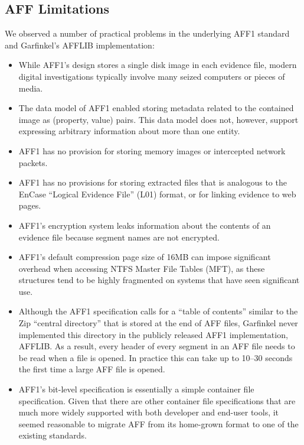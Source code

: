 \documentclass[10pt, conference]{IEEEtran}
\begin{document}
\subsection{AFF Limitations}
We observed a number of practical problems in the underlying AFF1
standard and Garfinkel's AFFLIB implementation:

\begin{itemize}
\item While AFF1's design stores a single disk image in each evidence
  file, modern digital investigations typically involve many seized
  computers or pieces of media. 

\item The data model of AFF1 enabled storing metadata related to the 
  contained image as (property, value) pairs. This data model does
  not, however, support expressing arbitrary information about more
  than one entity.

\item AFF1 has no provision for storing memory images or intercepted
  network packets.

\item AFF1 has no provisions for storing extracted files that is
  analogous to the EnCase ``Logical Evidence File'' (L01) format, or
  for linking evidence to web pages.

\item AFF1's encryption system leaks information about the contents of
  an evidence file because segment names are not encrypted.

\item AFF1's default compression page size of 16MB can impose significant overhead
  when accessing NTFS Master File Tables (MFT), as these structures
  tend to be highly fragmented on systems that have seen significant
  use.

\item Although the AFF1 specification calls for a ``table of contents'' similar
  to the Zip\cite{zip-format} ``central directory'' that is stored at
  the end of AFF files, Garfinkel never implemented this directory in
  the publicly released AFF1 implementation, AFFLIB. As a result,
  every header of every segment in an AFF file needs to be read when a
  file is opened. In practice this can take up to 10--30 seconds the
  first time a large AFF file is opened. 



\item AFF1's bit-level specification is essentially a simple container
  file specification. Given that there are other container file
  specifications that are much more widely supported with both
  developer and end-user tools, it seemed reasonable to migrate AFF
  from its home-grown format to one of the existing standards.

\end{itemize}
\end{document}
